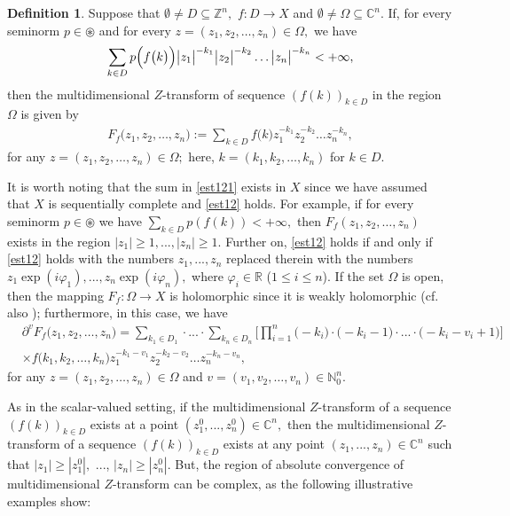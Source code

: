 \documentclass{amsart}
\theoremstyle{definition}
\newtheorem{defn}[thm]{Definition}
\theoremstyle{remark}
\numberwithin{equation}{section}
\begin{document}
\begin{defn}\label{manule}
Suppose that $\emptyset \neq D\subseteq {\mathbb Z}^{n},$ $f: D \rightarrow X$ and $\emptyset \neq \Omega \subseteq {\mathbb C}^{n}$. If, for every seminorm $p\in \circledast$ and for every $z=(z_{1},z_{2},\ldots ,z_{n})\in \Omega ,$ we have
\begin{align}\label{est12}
\sum _{k\in D }p\Bigl(f\bigl(k\bigr)\Bigr)\bigl|z_{1}\bigr|^{-k_{1}}\bigl|z_{2}\bigr|^{-k_{2}}\ldots \bigl| z_{n}\bigr|^{-k_{n}}<+\infty ,
\end{align} 
then the multidimensional $Z$-transform of sequence $(f(k))_{k\in D}$ in the region $\Omega$
is given by
\begin{align}\label{est121}
F_{f}\bigl(z_{1},z_{2},\ldots ,z_{n}\bigr):=\sum _{k\in D }f\bigl(k\bigr)z_{1}^{-k_{1}}z_{2}^{-k_{2}}\ldots z_{n}^{-k_{n}},  
\end{align}
for any $z=(z_{1},z_{2},\ldots ,z_{n})\in \Omega ;$ here, $k=(k_{1},k_{2},\ldots ,k_{n})$ for $k\in D.$
\end{defn}

It is worth noting that the sum in \eqref{est121} exists in $X$ since we have assumed that $X$ is sequentially complete and \eqref{est12} holds. For example, if for every seminorm $p\in \circledast$ we have $\sum _{k\in D }p (f (k ) )<+\infty,$ then 
$F_{f}(z_{1},z_{2},\ldots ,z_{n})$ exists in the region $|z_{1}|\geq 1,...,|z_{n}|\geq 1.$
Further on, 
\eqref{est12} holds if and only if \eqref{est12} holds with the numbers $z_{1},...,z_{n}$ replaced therein with the numbers $z_{1}\exp(i\varphi_{1}),...,z_{n}\exp(i\varphi_{n}),$ where $ \varphi_{i}\in {\mathbb R}$ ($1\leq i\leq n$). If the set $\Omega$ is open, then the mapping $F_{f} : \Omega \rightarrow X$ is holomorphic since it is weakly holomorphic (cf. also \cite[Theorem 2.1.2]{gregor}); furthermore, in this case, we have
\begin{align*}&
\partial^{v}F_{f}\bigl(z_{1},z_{2},\ldots ,z_{n}\bigr)=\sum _{k_{1}\in D_{1} }\cdot ... \cdot \sum _{k_{n}\in D_{n} }\Biggl[\prod_{i=1}^{n}\bigl(-k_{i}\bigr) \cdot \bigl(-k_{i}-1\bigr) \cdot ... \cdot \bigl(-k_{i}-v_{i}+1\bigr)\Biggr] 
\\& \times f\bigl(k_{1},k_{2},\ldots ,k_{n}\bigr)z_{1}^{-k_{1}-v_{1}}z_{2}^{-k_{2}-v_{2}}\ldots z_{n}^{-k_{n}-v_{n}},
\end{align*}
for any $z=(z_{1},z_{2},\ldots ,z_{n})\in \Omega$ and $v=(v_{1},v_{2},\ldots ,v_{n})\in {\mathbb N}_{0}^{n}.$

As in the scalar-valued setting, if the multidimensional $Z$-transform of a sequence $(f(k))_{k\in D}$ exists at a point $(z_{1}^{0},...,z_{n}^{0})\in {\mathbb C}^{n},$ then the multidimensional $Z$-transform of a sequence $(f(k))_{k\in D}$ exists at any point $(z_{1},...,z_{n})\in {\mathbb C}^{n}$ such that $|z_{1}|\geq |z_{1}^{0}|,$ ..., $|z_{n}|\geq |z_{n}^{0}|.$ But, the region of absolute convergence of multidimensional $Z$-transform can be complex, as the following illustrative examples show:
\end{document}
